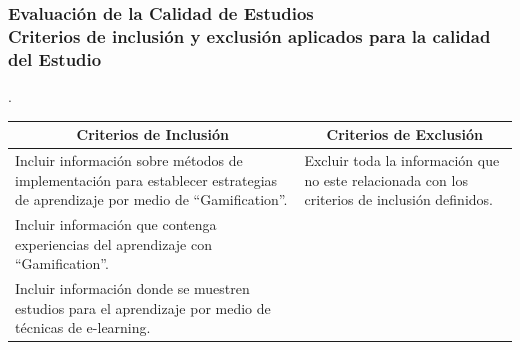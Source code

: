 \documentclass{beamer}
\begin{document}
\begin{frame}
    \frametitle{Evaluación de la Calidad de Estudios\\ Criterios de inclusión y exclusión aplicados para la calidad del Estudio}
    .\begin{table}
    	\begin{center}
    		\begin{tabular}{| p{6cm} | p{4cm} |}
    			\hline
    			\multicolumn{1}{|c|}{\textbf{Criterios de Inclusión}} & \multicolumn{1}{|c|}{\textbf{Criterios de Exclusión}} \\
    			\hline
    			Incluir información sobre métodos de implementación para establecer estrategias de aprendizaje por medio de ``Gamification''.{ }& Excluir toda la información que no este relacionada con los criterios de inclusión definidos.\\
    			\hline
    			Incluir información que contenga experiencias del aprendizaje con ``Gamification''. &{ } \\
    			\hline
    			Incluir información donde se muestren estudios para el aprendizaje por medio de técnicas de e-learning.& { }\\ \hline
    		\end{tabular}
    	\end{center}
    \end{table}
\end{frame}
\end{document}
